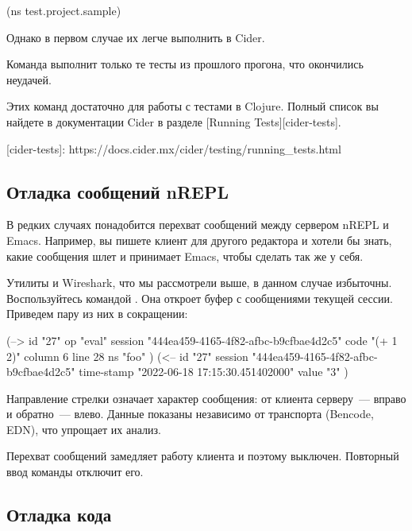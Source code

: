 \begin{english}
  \begin{clojure}
(ns test.project.sample)
  \end{clojure}
\end{english}

Однако в первом случае их легче выполнить в Cider.

Команда  выполнит только те тесты из прошлого прогона, что окончились неудачей.

Этих команд достаточно для работы с тестами в Clojure. Полный список вы найдете в документации Cider в разделе [Running Tests][cider-tests].

[cider-tests]: https://docs.cider.mx/cider/testing/running\_tests.html

\subsection{Отладка сообщений nREPL}

В редких случаях понадобится перехват сообщений между сервером nREPL и Emacs. Например, вы пишете клиент для другого редактора и хотели бы знать, какие сообщения шлет и принимает Emacs, чтобы сделать так же у себя.

Утилиты  и Wireshark, что мы рассмотрели выше, в данном случае избыточны. Воспользуйтесь командой . Она откроет буфер  с сообщениями текущей сессии. Приведем пару из них в сокращении:

\begin{english}
  \begin{text}
(-->
  id        "27"
  op        "eval"
  session   "444ea459-4165-4f82-afbc-b9cfbae4d2c5"
  code      "(+ 1 2)"
  column    6
  line      28
  ns        "foo"
)
(<--
  id         "27"
  session    "444ea459-4165-4f82-afbc-b9cfbae4d2c5"
  time-stamp "2022-06-18 17:15:30.451402000"
  value      "3"
)
  \end{text}
\end{english}

Направление стрелки означает характер сообщения: от клиента серверу~--- вправо и обратно~--- влево. Данные показаны независимо от транспорта (Bencode, EDN), что упрощает их анализ.

Перехват сообщений замедляет работу клиента и поэтому выключен. Повторный ввод команды отключит его.

\subsection{Отладка кода}

